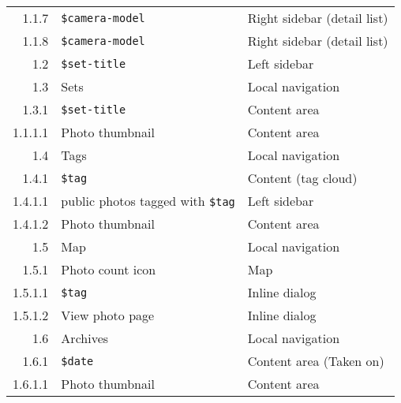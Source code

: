 \documentclass[11pt,a4paper]{article}
\newcommand{\var}[1]{\texttt{\${#1}}}
\begin{document}
\begin{center}
\begin{small}
\begin{longtable}{rll}
          1.1.7 &
          \var{camera-model} &
          Right sidebar (detail list) \\

          1.1.8 &
          \var{camera-model} &
          Right sidebar (detail list) \\

        1.2 &
        \var{set-title} &
        Left sidebar \\

        1.3 &
        Sets &
        Local navigation \\

          1.3.1 &
          \var{set-title} &
          Content area \\

            1.1.1.1 &
            Photo thumbnail &
            Content area \\


        1.4 &
        Tags &
        Local navigation \\

          1.4.1 &
          \var{tag} &
          Content (tag cloud) \\

            1.4.1.1 &
            public photos tagged with \var{tag} &
            Left sidebar \\

            1.4.1.2 &
            Photo thumbnail &
            Content area \\


        1.5 &
        Map &
        Local navigation \\

          1.5.1 &
          Photo count icon &
          Map \\

            1.5.1.1 &
            \var{tag} &
            Inline dialog \\

            1.5.1.2 &
            View photo page &
            Inline dialog \\

        1.6 &
        Archives &
        Local navigation \\

          1.6.1 &
          \var{date} &
          Content area (Taken on) \\

            1.6.1.1 &
            Photo thumbnail &
            Content area \\


\end{longtable}
\end{small}
\end{center}
\end{document}
